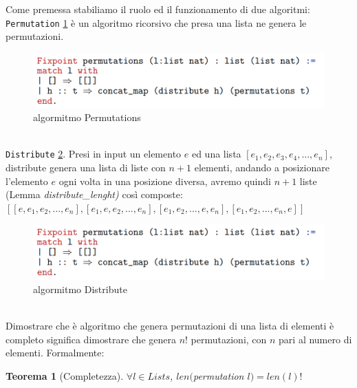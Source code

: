 \documentclass[a4paper]{article}
\newtheorem*{theorem}{Teorema}
\begin{document}
Come premessa stabiliamo il ruolo ed il funzionamento di due algoritmi:
\texttt{Permutation} \ref{FIG:PERM} è un algoritmo ricorsivo che presa una lista ne genera le permutazioni.
\begin{figure}[!ht]
\centering
\includegraphics[width=1\textwidth]{./img/A3_perm.png}
\caption{algormitmo Permutations} \label{FIG:PERM}
\end{figure}\\
\texttt{Distribute} \ref{FIG:DIST}. Presi in input un elemento $e$ ed una lista $[e_1,e_2,e_3,e_4,...,e_n]$, distribute genera una lista di liste con $n+1$ elementi, andando a posizionare l'elemento $e$ ogni volta in una posizione diversa, avremo quindi $n+1$ liste (Lemma \textit{distribute\_lenght)} così composte: $[[e,e_1,e_2,...,e_n],[e_1,e,e_2,...,e_n],[e_1,e_2,...,e,e_n],[e_1,e_2,...,e_n,e]]$  
\begin{figure}[!ht]
\centering
\includegraphics[width=1\textwidth]{./img/A3_perm.png}
\caption{algormitmo Distribute} \label{FIG:DIST}
\end{figure}\\
Dimostrare che è algoritmo che genera permutazioni di una lista di elementi è completo significa dimostrare che genera $n!$ permutazioni, con $n$ pari al numero di elementi. Formalmente:
\begin{theorem}[Completezza] $\forall l \in Lists$, $len($\textit{permutation} $l) = len(l)!$\end{theorem}
\end{document}
